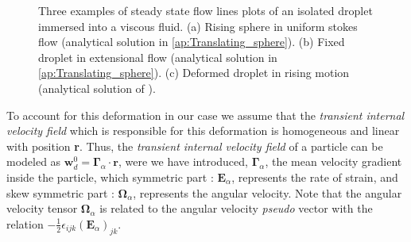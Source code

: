 \begin{figure}
    \centering
    \caption{Three examples of steady state flow lines plots of an isolated droplet immersed into a viscous fluid. 
    (a) Rising sphere in uniform stokes flow (analytical solution in \ref{ap:Translating_sphere}). 
    (b) Fixed droplet in extensional flow (analytical solution in \ref{ap:Translating_sphere}).
    (c) Deformed droplet in rising motion (analytical solution of \citet{taylor1964deformation}). }
    \label{fig:flowlines}
\end{figure} 
To account for this deformation in our case we assume that the \textit{transient internal velocity field} which is responsible for this deformation is homogeneous and linear with position \textbf{r}. 
Thus, the \textit{transient internal velocity field} of a particle can be modeled as $\textbf{w}_d^0 = \bm\Gamma_\alpha \cdot \textbf{r}$, were we have introduced, $\bm\Gamma_\alpha$, the mean velocity gradient inside the particle, which symmetric part : $\textbf{E}_\alpha$, represents the rate of strain, and skew symmetric part : $\bm\Omega_\alpha$, represents the angular velocity. 
Note that the angular velocity tensor $\bm\Omega_\alpha$ is related to the angular velocity \textit{pseudo} vector with the relation $-\frac{1}{2}\epsilon_{ijk} (\textbf{E}_\alpha)_{jk}$. 

